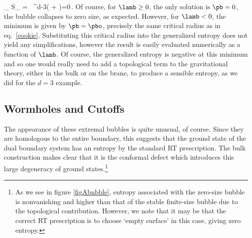\beq\label{amazing}
  \partial_{\pb} S_\gen
  = \, \pb^{d-3}\left(
   + \lamb \right)=0\,.
\eeq
Of course, for $\lamb\ge0$, the only solution is $\pb=0$, \ie the bubble collapses to zero size, as expected. However, for $\lamb<0$, the minimum is given by $\pb=\pbo$, precisely the same critical  radius as in eq.~\eqref{cookie}. Substituting this critical radius into the generalized entropy  does not yield any simplifications, however the result is easily evaluated numerically as a function of $\lamb$. Of course, the generalized entropy  is negative at this minimum and so one would really need to add a topological term to the gravitational theory, either in the bulk or on the brane, to produce a sensible entropy, as we did for the $d=3$ example.


\subsection*{Wormholes and Cutoffs} %

The appearance of these extremal bubbles is quite unusual, of course. Since they are homologous to the entire boundary, this suggests that the ground state of the dual boundary system has an entropy by the standard RT prescription. The bulk construction makes clear that it is the conformal defect which introduces this large degeneracy of ground states.\footnote{As we see in figure \ref{figAbubble}, entropy associated with the zero-size bubble is nonvanishing and higher than that of the stable finite-size bubble due to the topological contribution. However, we note that it may be that the correct RT prescription is to choose `empty surface' in this case, giving zero entropy.} %

